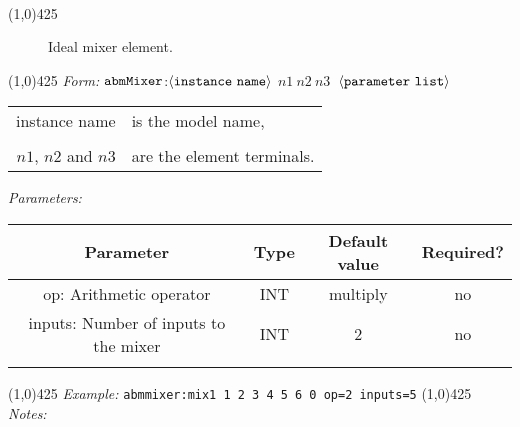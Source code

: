 \documentclass{article}
\begin{document}
\\
\hrulefill \linethickness{0.5mm}\line(1,0){425} \normalsize
\newline
\begin{figure}[h]
\centerline{\epsfxsize=2.5in } \caption{Ideal
mixer element.}
\end{figure}
\newline
\linethickness{0.5mm}\line(1,0){425}
\newline %
\textit{Form:} $\tt abmMixer$:$\langle \tt{instance\ name}\rangle$
$n1\ n2\ n3\ $ $\langle \tt{parameter\ list}\rangle$
\newline
\begin{tabular}{r l}
instance name & is the model name, \\
&  \\
$n1$, $n2$ and $n3$ & are the element terminals. \\
\end{tabular}
\newline
\textit{Parameters:}%
\begin{table}[H]
\begin{tabular}{|c|c|c|c|}
\hline
Parameter&Type&Default value&Required?\\
\hline
op: Arithmetic operator & INT & multiply & no \\
\hline
inputs: Number of inputs to the mixer & INT & 2 & no \\
\par
\hline
\end{tabular}
\end{table}
\noindent\linethickness{0.5mm}\line(1,0){425}
\newline
\textit{Example:}%
\newline
\texttt{abmmixer:mix1\ 1\ 2\ 3\ 4\ 5\ 6\ 0\ op=2 inputs=5}
\newline
\linethickness{0.5mm} \line(1,0){425}
\newline
\textit{Notes:}\\ %
\end{document}
